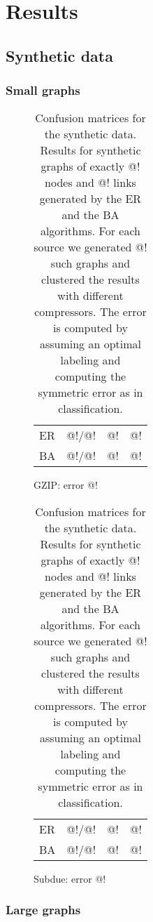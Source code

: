 \documentclass[10pt,a4paper,oneside]{article}
\begin{document}
\section*{Results}

\subsection*{Synthetic data}

\subsubsection*{Small graphs}

\begin{table}[h]
\label{table:synthetic-small}

\begin{subfigure}[b]{0.5\columnwidth}
	\label{table:gzip-small}
	\centering
	\begin{tabular}{l | r | r r}
	\hline
	  ER & @!/@! & @! & @! \\
	  BA & @!/@! & @! & @! \\
	\hline
	\end{tabular}
	\caption{GZIP: error @!}
\end{subfigure}\begin{subfigure}[b]{0.5\columnwidth}
	\label{table:subdue-small}
	\centering
	\begin{tabular}{l| r | r r}
	\hline
	  ER & @!/@! & @! & @! \\
	  BA & @!/@! & @! & @! \\
	\hline
	\end{tabular}
	\caption{Subdue: error @!}
\end{subfigure}

\caption{Confusion matrices for the synthetic data. Results for synthetic graphs of exactly @! nodes and @! links generated by the ER and the BA algorithms. For each source we generated @! such graphs and clustered the results with different compressors. The error is computed by assuming an optimal labeling and computing the symmetric error as in classification.}
\end{table}

\subsubsection*{Large graphs}
\end{document}
